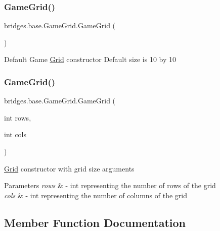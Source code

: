 \subsubsection{\texorpdfstring{Game\+Grid()}{GameGrid()}\hspace{0.1cm}{\footnotesize\ttfamily [1/2]}}
{\footnotesize\ttfamily bridges.\+base.\+Game\+Grid.\+Game\+Grid (\begin{DoxyParamCaption}{ }\end{DoxyParamCaption})}

Default Game \hyperlink{classbridges_1_1base_1_1_grid}{Grid} constructor Default size is 10 by 10 \mbox{\label{classbridges_1_1base_1_1_game_grid_acfe6d52979dae94b1d883fed4965feb3}} 
\subsubsection{\texorpdfstring{Game\+Grid()}{GameGrid()}\hspace{0.1cm}{\footnotesize\ttfamily [2/2]}}
{\footnotesize\ttfamily bridges.\+base.\+Game\+Grid.\+Game\+Grid (\begin{DoxyParamCaption}\item[{int}]{rows,  }\item[{int}]{cols }\end{DoxyParamCaption})}

\hyperlink{classbridges_1_1base_1_1_grid}{Grid} constructor with grid size arguments


\begin{DoxyParams}{Parameters}
{\em rows} & -\/ int representing the number of rows of the grid \\
\hline
{\em cols} & -\/ int representing the number of columns of the grid \\
\hline
\end{DoxyParams}


\subsection{Member Function Documentation}
\mbox{\label{classbridges_1_1base_1_1_game_grid_a8eee4918e2cbfc956a92a39252590114}} 
